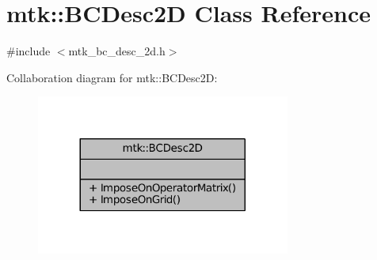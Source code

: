 \hypertarget{classmtk_1_1BCDesc2D}{\section{mtk\+:\+:B\+C\+Desc2\+D Class Reference}
\label{classmtk_1_1BCDesc2D}
}


{\ttfamily \#include $<$mtk\+\_\+bc\+\_\+desc\+\_\+2d.\+h$>$}



Collaboration diagram for mtk\+:\+:B\+C\+Desc2\+D\+:\nopagebreak
\begin{figure}[H]
\begin{center}
\leavevmode
\includegraphics[width=236pt]{classmtk_1_1BCDesc2D__coll__graph}
\end{center}
\end{figure}
